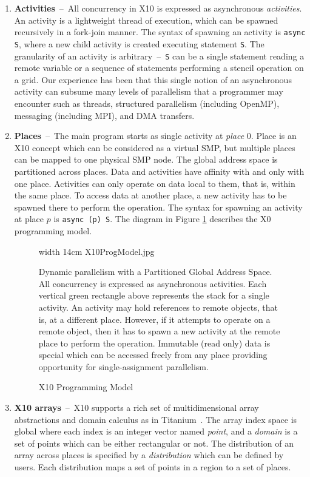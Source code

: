 \documentclass[10pt]{article}
\numberwithin{equation}{section}
\def\Xten{{\sf X10}}
\begin{document}
\begin{enumerate}
\item{\bf Activities}~--~All concurrency in \Xten{} is expressed as asynchronous {\em activities}. An activity is a lightweight thread of execution, which can be spawned recursively in a fork-join manner. The syntax of spawning an activity is {\tt async S}, where a new child activity is created executing statement {\tt S}. The granularity of an activity is arbitrary~--~{\tt S} can be a single statement reading a remote variable or a sequence of statements performing a stencil operation on a grid.  Our experience has been that this single notion of an asynchronous activity can subsume many levels of parallelism that  a programmer may encounter such as threads, structured parallelism (including OpenMP), messaging (including MPI), and DMA transfers.  
\item{\bf Places}~--~The main program starts as single activity at {\em place} 0. Place is an \Xten{} concept which can be considered as a virtual SMP, but multiple places can be mapped to one physical SMP node. The global address space is partitioned across places. Data and activities have affinity with and only with one place. Activities can only operate on data local to them, that is, within the same place. To access data at another place, a new activity has to be spawned there to perform the operation. The syntax for spawning an activity at place $p$ is {\tt async (p) S}. The diagram in Figure \ref{fig 1} describes the X0 programming model.

\begin{figure}
\begin{center}
\pdfimage width 14cm  {X10ProgModel.jpg}
\end{center}

Dynamic parallelism with a Partitioned Global Address Space. All
concurrency is expressed as asynchronous activities.  Each vertical
green rectangle above represents the stack for a single activity. An
activity may hold references to remote objects, that is, at a
different place.  However, if it attempts to operate on a remote
object, then it has to spawn a new activity at the remote place to
perform the operation.  Immutable (read only) data is special which
can be accessed freely from any place providing opportunity for
single-assignment parallelism.
\caption{\Xten{} Programming Model}
\label{fig 1}

\end{figure}


\item{\bf \Xten{} arrays}~--~\Xten{} supports a rich set of multidimensional array abstractions and domain calculus as in Titanium~\cite{titaniumDoc}. The array index space is global where each index is an integer vector named {\em point}, and a {\em domain} is a set of points which can be either rectangular or not. The distribution of an array across places is specified by a {\em distribution} which can be defined by users. Each distribution maps a set of points in a region to a set of places. 


\end{enumerate}
\end{document}
